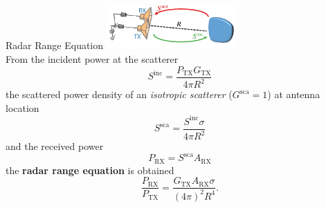 \begin{info}{Radar Range Equation}
  \hspace{.5cm}\includegraphics[width=5cm]{./content/at_meas/pictures/radar_range_eq}\\
  From the incident power at the scatterer
  \begin{equation*}
    S^{\text{inc}} = \dfrac{P_{\text{TX}}G_{\text{TX}}}{4\pi R^{2}}
  \end{equation*}
  the scattered power density of an \textit{isotropic scatterer} ($G^{\text{sca}}=1$) at antenna location
  \begin{equation*}
    S^{\text{sca}} = \dfrac{S^{\text{inc}}\sigma}{4\pi R^{2}}
  \end{equation*}
  and the received power
  \begin{equation*}
    P_{\text{RX}} = S^{\text{sca}} A_{\text{RX}}
  \end{equation*}
  the \textbf{radar range equation} is obtained
  \begin{equation}
    \dfrac{P_{\text{RX}}}{P_{\text{TX}}} = \dfrac{G_{\text{TX}}A_{\text{RX}}\sigma}{{(4\pi)}^{2} R^{4}}.
  \end{equation}
\end{info}

